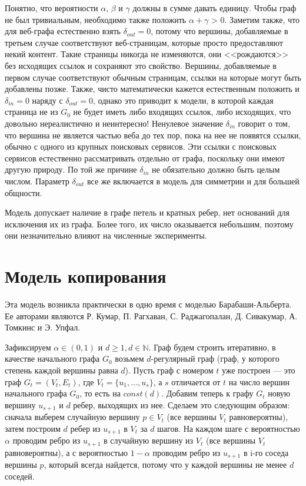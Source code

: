 \documentclass[14pt]{extreport}
\begin{document}
Понятно, что вероятности $\alpha$, $\beta$ и $\gamma$ должны в сумме давать единицу. Чтобы граф не был тривиальным, необходимо также положить $\alpha + \gamma$ > 0. Заметим также, что для веб-графа естественно взять $\delta_{out} = 0$, потому что вершины, добавляемые в третьем случае соответствуют веб-страницам, которые просто предоставляют некий контент. Такие страницы никогда не изменяются, они <<рождаются>> без исходящих ссылок и сохраняют это свойство. Вершины, добавляемые в первом случае соответствуют обычным страницам, ссылки на которые могут быть добавлены позже. Также, чисто математически кажется естественным положить и $\delta_{in} = 0$ наряду с $\delta_{out} = 0$, однако это приводит к модели, в которой каждая страница не из $G_0$ не будет иметь либо входящих ссылок, либо исходящих, что довольно нереалистично и неинтересно! Ненулевое значение $\delta_{in}$ говорит о том, что вершина не является частью веба до тех пор, пока на нее не появятся ссылки, обычно с одного из крупных поисковых сервисов. Эти ссылки с поисковых сервисов естественно рассматривать отдельно от графа, поскольку они имеют другую природу. По той же причине $\delta_{in}$ не обязательно должно быть целым числом. Параметр $\delta_{out}$ все же включается в модель для симметрии и для большей общности.

Модель допускает наличие в графе петель и кратных ребер, нет оснований для исключения их из графа. Более того, их число оказывается небольшим, поэтому они незначительно влияют на численные эксперименты. 

\section{Модель копирования}

Эта модель возникла практически в одно время с моделью Барабаши-Альберта. Ее авторами являются Р. Кумар, П. Рагхаван, С. Раджагопалан, Д. Сивакумар, А. Томкинс и Э. Упфал.

Зафиксируем $\alpha \in (0,1)$ и $d \geqslant 1, d \in \mathbb{N}$. Граф будем строить итеративно, в качестве начального графа $G_0$ возьмем $d$-регулярный граф (граф, у которого степень каждой вершины равна $d$). Пусть граф с номером $t$ уже построен --- это граф $G_t = (V_t, E_t)$, где $V_t = \{u_1, \dots, u_s\}$, а $s$ отличается от $t$ на число вершин начального графа $G_0$, то есть на $const(d)$. Добавим теперь к графу $G_t$ новую вершину $u_{s+1}$ и $d$ ребер, выходящих из нее. Сделаем это следующим образом: сначала выберем случайную вершину $p \in V_t$ (все вершины $V_t$ равновероятны), затем построим $d$ ребер из $u_{s+1}$ в $V_t$ за $d$ шагов. На каждом шаге с вероятностью $\alpha$ проводим ребро из $u_{s+1}$ в случайную вершину из $V_t$ (все вершины $V_t$ равновероятны), а с вероятностью $1-\alpha$ проводим ребро из $u_{s+1}$ в i-го соседа вершины $p$, который всегда найдется, потому что у каждой вершины не менее $d$ соседей. 
\end{document}
